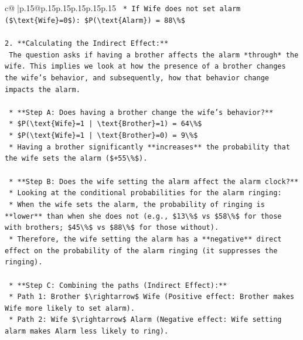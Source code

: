 \documentclass{article}
\begin{document}
{\begin{supertabular}{c@{$\;$}|p{.15\linewidth}@{}p{.15\linewidth}p{.15\linewidth}p{.15\linewidth}p{.15\linewidth}p{.15\linewidth}}
{{{\texttt{        *   If Wife does not set alarm (\$\textbackslash{}text\{Wife\}=0\$): \$P(\textbackslash{}text\{Alarm\}) = 88\textbackslash{}\%\$} \\
\\ 
\texttt{2.  **Calculating the Indirect Effect:**} \\
\texttt{    The question asks if having a brother affects the alarm *through* the wife. This implies we look at how the presence of a brother changes the wife's behavior, and subsequently, how that behavior change impacts the alarm.} \\
\\ 
\texttt{    *   **Step A: Does having a brother change the wife's behavior?**} \\
\texttt{        *   \$P(\textbackslash{}text\{Wife\}=1 | \textbackslash{}text\{Brother\}=1) = 64\textbackslash{}\%\$} \\
\texttt{        *   \$P(\textbackslash{}text\{Wife\}=1 | \textbackslash{}text\{Brother\}=0) = 9\textbackslash{}\%\$} \\
\texttt{        *   Having a brother significantly **increases** the probability that the wife sets the alarm (\$+55\textbackslash{}\%\$).} \\
\\ 
\texttt{    *   **Step B: Does the wife setting the alarm affect the alarm clock?**} \\
\texttt{        *   Looking at the conditional probabilities for the alarm ringing:} \\
\texttt{        *   When the wife sets the alarm, the probability of ringing is **lower** than when she does not (e.g., \$13\textbackslash{}\%\$ vs \$58\textbackslash{}\%\$ for those with brothers; \$45\textbackslash{}\%\$ vs \$88\textbackslash{}\%\$ for those without).} \\
\texttt{        *   Therefore, the wife setting the alarm has a **negative** direct effect on the probability of the alarm ringing (it suppresses the ringing).} \\
\\ 
\texttt{    *   **Step C: Combining the paths (Indirect Effect):**} \\
\texttt{        *   Path 1: Brother \$\textbackslash{}rightarrow\$ Wife (Positive effect: Brother makes Wife more likely to set alarm).} \\
\texttt{        *   Path 2: Wife \$\textbackslash{}rightarrow\$ Alarm (Negative effect: Wife setting alarm makes Alarm less likely to ring).} \\
}}}
\end{supertabular}}
\end{document}
